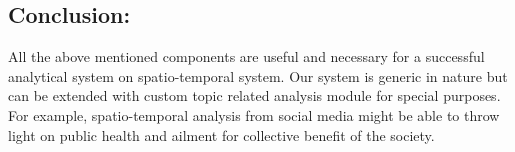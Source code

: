 \subsection{Conclusion:}
All the above mentioned components are useful and necessary for a successful analytical system on spatio-temporal system. Our system is generic in nature but can be extended with custom topic related analysis module for special purposes. For example, spatio-temporal analysis from social media might be able to throw light on public health and ailment for collective benefit of the society.


